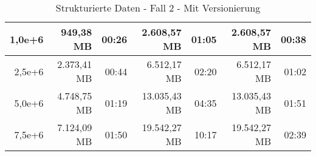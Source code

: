 \begin{table}
\begin{tabular}{|r|r|r|r|r|r|r|}
        1,0e+6          & 949,38 MB           & 00:26           & 2.608,57 MB         & 01:05           & 2.608,57 MB         & 00:38           \\ \hline
        2,5e+6          & 2.373,41 MB         & 00:44           & 6.512,17 MB         & 02:20           & 6.512,17 MB         & 01:02           \\ \hline
        5,0e+6          & 4.748,75 MB         & 01:19           & 13.035,43 MB        & 04:35           & 13.035,43 MB        & 01:51           \\ \hline
        7,5e+6          & 7.124,09 MB         & 01:50           & 19.542,27 MB        & 10:17           & 19.542,27 MB        & 02:39           \\ \hline
    \end{tabular}
    \caption{Strukturierte Daten - Fall 2 - Mit Versionierung}
\end{table}

